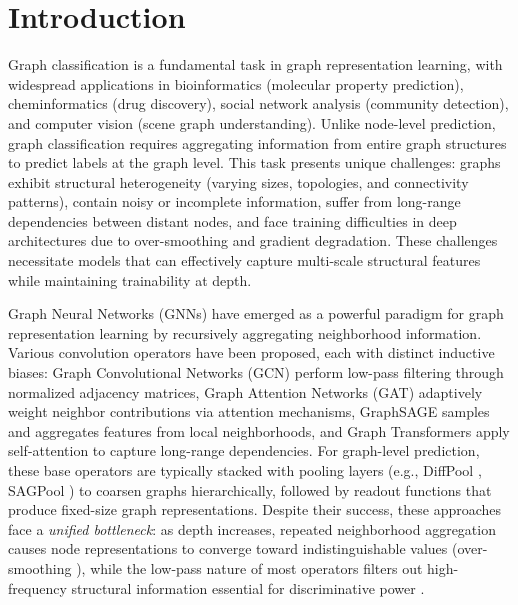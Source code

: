 \section{Introduction}

Graph classification is a fundamental task in graph representation learning, with widespread applications in bioinformatics (molecular property prediction), cheminformatics (drug discovery), social network analysis (community detection), and computer vision (scene graph understanding). Unlike node-level prediction, graph classification requires aggregating information from entire graph structures to predict labels at the graph level. This task presents unique challenges: graphs exhibit structural heterogeneity (varying sizes, topologies, and connectivity patterns), contain noisy or incomplete information, suffer from long-range dependencies between distant nodes, and face training difficulties in deep architectures due to over-smoothing and gradient degradation. These challenges necessitate models that can effectively capture multi-scale structural features while maintaining trainability at depth.

Graph Neural Networks (GNNs) have emerged as a powerful paradigm for graph representation learning by recursively aggregating neighborhood information. Various convolution operators have been proposed, each with distinct inductive biases: Graph Convolutional Networks (GCN) \cite{kipf2016semi} perform low-pass filtering through normalized adjacency matrices, Graph Attention Networks (GAT) \cite{velivckovic2017graph} adaptively weight neighbor contributions via attention mechanisms, GraphSAGE \cite{hamilton2017inductive} samples and aggregates features from local neighborhoods, and Graph Transformers \cite{dwivedi2020generalization} apply self-attention to capture long-range dependencies. For graph-level prediction, these base operators are typically stacked with pooling layers (e.g., DiffPool \cite{ying2018hierarchical}, SAGPool \cite{lee2019self}) to coarsen graphs hierarchically, followed by readout functions that produce fixed-size graph representations. Despite their success, these approaches face a \textit{unified bottleneck}: as depth increases, repeated neighborhood aggregation causes node representations to converge toward indistinguishable values (over-smoothing \cite{li2018deeper, chen2023revisiting}), while the low-pass nature of most operators filters out high-frequency structural information essential for discriminative power \cite{xu2018powerful}.

